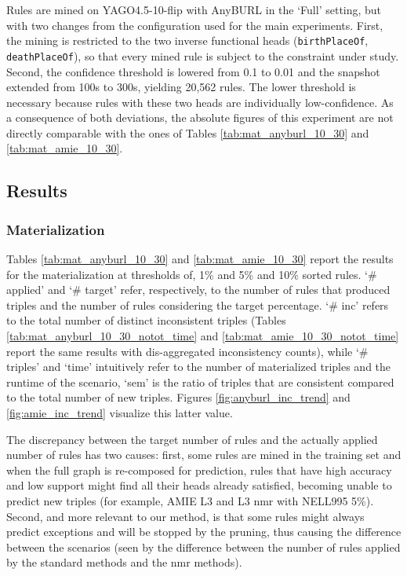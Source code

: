 \documentclass[a4paper,UKenglish,cleveref, autoref, thm-restate]{tgdk-v2021}
\begin{document}
Rules are mined on YAGO4.5-10-flip with AnyBURL in the `Full' setting, but with two changes from the configuration used for the main experiments. First, the mining is restricted to the two inverse functional heads (\texttt{birthPlaceOf}, \texttt{deathPlaceOf}), so that every mined rule is subject to the constraint under study. Second, the confidence threshold is lowered from 0.1 to 0.01 and the snapshot extended from 100s to 300s, yielding 20,562 rules. The lower threshold is necessary because rules with these two heads are individually low-confidence. As a consequence of both deviations, the absolute figures of this experiment are not directly comparable with the ones of Tables \ref{tab:mat_anyburl_10_30} and \ref{tab:mat_amie_10_30}.

\subsection{Results}

\subsubsection{Materialization} Tables \ref{tab:mat_anyburl_10_30} and \ref{tab:mat_amie_10_30} report the results for the materialization at thresholds of, 1\% and 5\% and 10\% sorted rules. `\# applied' and `\# target' refer, respectively, to the number of rules that produced triples and the number of rules considering the target percentage. `\# inc' refers to the total number of distinct inconsistent triples (Tables \ref{tab:mat_anyburl_10_30_notot_time} and \ref{tab:mat_amie_10_30_notot_time} report the same results with dis-aggregated inconsistency counts), while `\# triples' and `time' intuitively refer to the number of materialized triples and the runtime of the scenario, `sem' is the ratio of triples that are consistent compared to the total number of new triples. Figures \ref{fig:anyburl_inc_trend} and \ref{fig:amie_inc_trend} visualize this latter value.
 
The discrepancy between the target number of rules and the actually applied number of rules has two causes: first, some rules are mined in the training set and when the full graph is re-composed for prediction, rules that have high accuracy and low support might find all their heads already satisfied, becoming unable to predict new triples (for example, AMIE L3 and L3 nmr with NELL995 5\%). Second, and more relevant to our method, is that some rules might always predict exceptions and will be stopped by the pruning, thus causing the difference between the scenarios (seen by the difference between the number of rules applied by the standard methods and the nmr methods).
\end{document}
